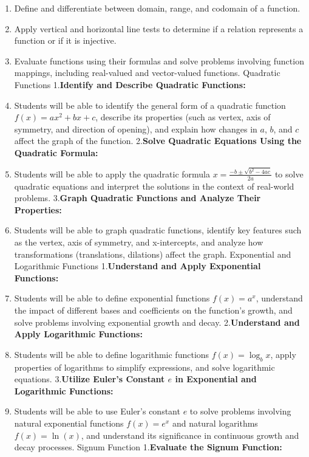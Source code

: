 \begin{enumerate}
    \item Define and differentiate between domain, range, and codomain of a function.
    \item Apply vertical and horizontal line tests to determine if a relation represents a function or if it is injective.
    \item Evaluate functions using their formulas and solve problems involving function mappings, including real-valued and vector-valued functions. Quadratic Functions 1.\textbf{Identify and Describe Quadratic Functions:}
    \item Students will be able to identify the general form of a quadratic function $f(x) = ax^2 + bx + c$, describe its properties (such as vertex, axis of symmetry, and direction of opening), and explain how changes in $a$, $b$, and $c$ affect the graph of the function. 2.\textbf{Solve Quadratic Equations Using the Quadratic Formula:}
    \item Students will be able to apply the quadratic formula $ x = \frac{-b \pm \sqrt{b^2 - 4ac}}{2a} $ to solve quadratic equations and interpret the solutions in the context of real-world problems. 3.\textbf{Graph Quadratic Functions and Analyze Their Properties:}
    \item Students will be able to graph quadratic functions, identify key features such as the vertex, axis of symmetry, and x-intercepts, and analyze how transformations (translations, dilations) affect the graph. Exponential and Logarithmic Functions 1.\textbf{Understand and Apply Exponential Functions:}
    \item Students will be able to define exponential functions $ f(x) = a^x $, understand the impact of different bases and coefficients on the function's growth, and solve problems involving exponential growth and decay. 2.\textbf{Understand and Apply Logarithmic Functions:}
    \item Students will be able to define logarithmic functions $ f(x) = \log_b x $, apply properties of logarithms to simplify expressions, and solve logarithmic equations. 3.\textbf{Utilize Euler's Constant $ e $ in Exponential and Logarithmic Functions:}
    \item Students will be able to use Euler's constant $ e $ to solve problems involving natural exponential functions $ f(x) = e^x $ and natural logarithms $ f(x) = \ln(x) $, and understand its significance in continuous growth and decay processes. Signum Function 1.\textbf{Evaluate the Signum Function:}

\end{enumerate}
